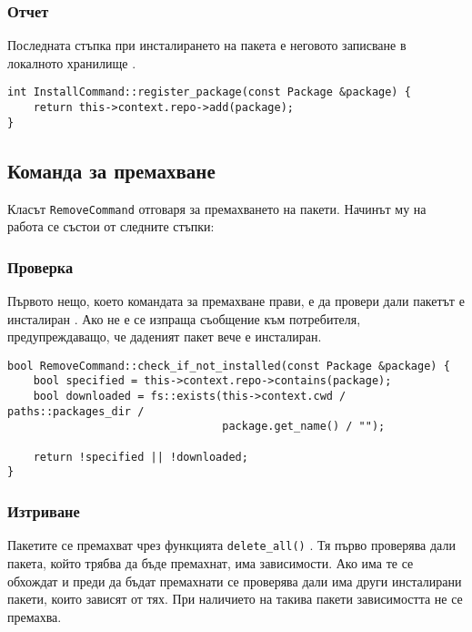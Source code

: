 \subsubsection{Отчет}

Последната стъпка при инсталирането на пакета е неговото записване в локалното
хранилище .

\begin{lstlisting}[style=cpp,
				   caption=Функция за отчитане на пакет,
				   label={lst:install-register}]
int InstallCommand::register_package(const Package &package) {
	return this->context.repo->add(package);
}
\end{lstlisting}


\subsection{Команда за премахване}

Класът \texttt{RemoveCommand} отговаря за премахването на пакети. Начинът му
на работа се състои от следните стъпки:


\subsubsection{Проверка}

Първото нещо, което командата за премахване прави, е да провери дали пакетът е
инсталиран . Ако не е се изпраща съобщение към
потребителя, предупреждаващо, че даденият пакет вече е инсталиран.

\begin{lstlisting}[style=cpp,
				   caption=Функция за проверка на пакет,
				   label={lst:remove-check}]
bool RemoveCommand::check_if_not_installed(const Package &package) {
    bool specified = this->context.repo->contains(package);
    bool downloaded = fs::exists(this->context.cwd / paths::packages_dir /
								 package.get_name() / "");

    return !specified || !downloaded;
}
\end{lstlisting}


\subsubsection{Изтриване}

Пакетите се премахват чрез функцията \texttt{delete\_all()}
. Тя първо проверява дали пакета, който трябва да бъде
премахнат, има зависимости. Ако има те се обхождат и преди да бъдат премахнати
се проверява дали има други инсталирани пакети, които зависят от тях. При
наличието на такива пакети зависимостта не се премахва.

